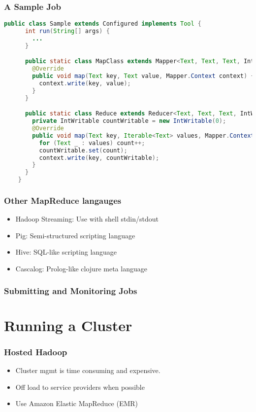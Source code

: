 \documentclass{beamer}
\begin{document}
\begin{frame}[fragile]
  \frametitle{A Sample Job}
  \begin{lstlisting}[language=java,basicstyle=\tiny\sffamily]
    public class Sample extends Configured implements Tool {
      int run(String[] args) {
        ...
      }

      public static class MapClass extends Mapper<Text, Text, Text, Int> {
        @Override
        public void map(Text key, Text value, Mapper.Context context) {
          context.write(key, value);
        }
      }

      public static class Reduce extends Reducer<Text, Text, Text, IntWritable> {
        private IntWritable countWritable = new IntWritable(0);
        @Override
        public void map(Text key, Iterable<Text> values, Mapper.Context context) {
          for (Text _ : values) count++;
          countWritable.set(count);
          context.write(key, countWritable);
        }
      }
    }
  \end{lstlisting}
\end{frame}

\frame
{
  \frametitle{Other MapReduce langauges}
  \begin{itemize}
    \item Hadoop Streaming: Use with shell stdin/stdout
    \item Pig: Semi-structured scripting language
    \item Hive: SQL-like scripting language
    \item Cascalog: Prolog-like clojure meta language
  \end{itemize}
}

\frame
{
  \frametitle{Submitting and Monitoring Jobs}

}

\section{Running a Cluster}

\frame 
{
  \frametitle{Hosted Hadoop}
  \begin{itemize}
    \item Cluster mgmt is time consuming and expensive.
    \item Off load to service providers when possible
    \item Use Amazon Elastic MapReduce (EMR)
  \end{itemize}
}
\end{document}
